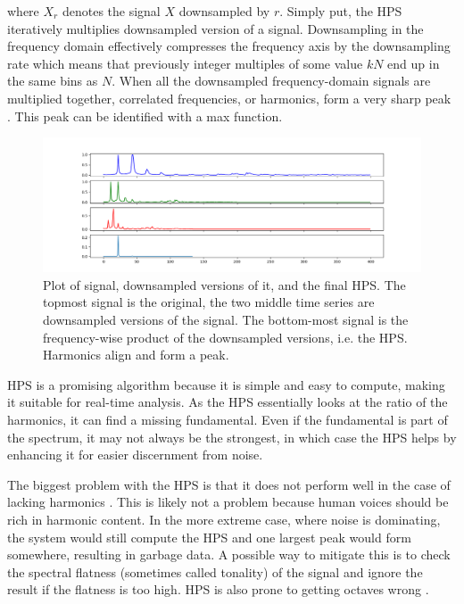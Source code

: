 \noindent where $X_r$ denotes the signal $X$ downsampled by $r$. Simply put, the HPS iteratively multiplies downsampled version of a signal. Downsampling in the frequency domain effectively compresses the frequency axis by the downsampling rate which means that previously integer multiples of some value $kN$ end up in the same bins as $N$. When all the downsampled frequency-domain signals are multiplied together, correlated frequencies, or harmonics, form a very sharp peak \cite{McLeod2008}. This peak can be identified with a max function.

\begin{figure}[ht] \centering \includegraphics[width=\textwidth]{./images/hps.png} \caption{Plot of signal, downsampled versions of it, and the final HPS. The topmost signal is the original, the two middle time series are downsampled versions of the signal. The bottom-most signal is the frequency-wise product of the downsampled versions, i.e. the HPS. Harmonics align and form a peak. \label{fig:hps}}
\end{figure}

HPS is a promising algorithm because it is simple and easy to compute, making it suitable for real-time analysis. As the HPS essentially looks at the ratio of the harmonics, it can find a missing fundamental. Even if the fundamental is part of the spectrum, it may not always be the strongest, in which case the HPS helps by enhancing it for easier discernment from noise.

The biggest problem with the HPS is that it does not perform well in the case of lacking harmonics \cite{McLeod2008}. This is likely not  a problem because human voices should be rich in harmonic content. In the more extreme case, where noise is dominating, the system would still compute the HPS and one largest peak would form somewhere, resulting in garbage data. A possible way to mitigate this is to check the spectral flatness (sometimes called tonality) of the signal and ignore the result if the flatness is too high. HPS is also prone to getting octaves wrong \cite{Smyth2019}.
